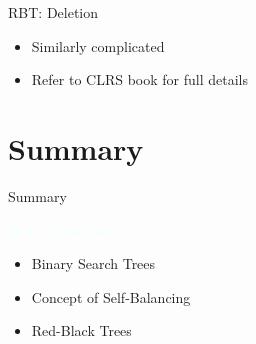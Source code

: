 \documentclass{beamer}
\newcommand{\tblue}[1]{{\Large {\textcolor{azure}{#1}}}}
\begin{document}
\begin{frame}{RBT: Deletion}
    \begin{itemize}
        \item Similarly complicated 
        \item Refer to CLRS book for full details
    \end{itemize}
\end{frame}

\section{Summary}
\begin{frame}{Summary}

\tblue{Major Concepts:}
\begin{itemize}
\item Binary Search Trees
\item Concept of Self-Balancing
\item Red-Black Trees
\end{itemize}
\end{frame}
\end{document}
